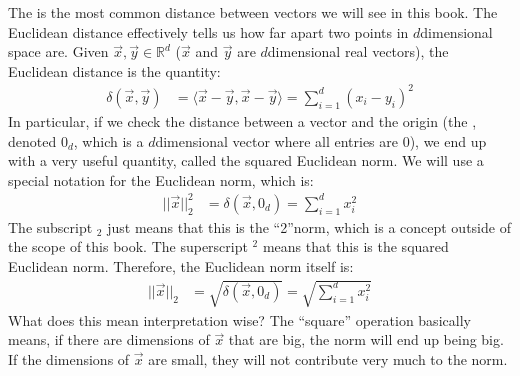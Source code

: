 \documentclass[letterpaper,10pt,english]{jupyterBook}
\begin{document}
\sphinxAtStartPar
The  is the most common distance between vectors we will see in this book. The Euclidean distance effectively tells us how far apart two points in \(d\)\sphinxhyphen{}dimensional space are. Given \(\vec x, \vec y \in \mathbb R^d\) (\(\vec x\) and \(\vec y\) are \(d\)\sphinxhyphen{}dimensional real vectors), the Euclidean distance is the quantity:
\begin{align*}
    \delta(\vec x, \vec y) &= \langle \vec x - \vec y, \vec x - \vec y\rangle = \sum_{i = 1}^d (x_i - y_i)^2
\end{align*}
\sphinxAtStartPar
In particular, if we check the distance between a vector and the origin (the , denoted \(0_d\), which is a \(d\)\sphinxhyphen{}dimensional vector where all entries are \(0\)), we end up with a very useful quantity, called the squared Euclidean norm. We will use a special notation for the Euclidean norm, which is:
\begin{align*}
    ||\vec x||_2^2 &= \delta(\vec x, 0_d) = \sum_{i = 1}^dx_i^2
\end{align*}
\sphinxAtStartPar
The subscript \(_2\) just means that this is the “2”\sphinxhyphen{}norm, which is a concept outside of the scope of this book. The superscript \(^2\) means that this is the squared Euclidean norm. Therefore, the Euclidean norm itself is:
\begin{align*}
||\vec x||_2 &= \sqrt{\delta(\vec x, 0_d)} = \sqrt{\sum_{i = 1}^d x_i^2}
\end{align*}
\sphinxAtStartPar
What does this mean interpretation wise? The “square” operation basically means, if there are dimensions of \(\vec x\) that are big, the norm will end up being big. If the dimensions of \(\vec x\) are small, they will not contribute very much to the norm.
\end{document}
